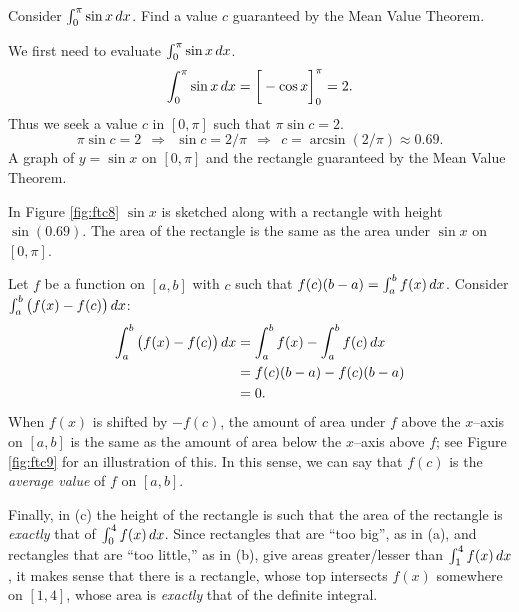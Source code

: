 \documentclass{ximera}
\begin{document}
\begin{example}%
  Consider $\int_0^\pi \sin x \,d x$. Find a value $c$ guaranteed by the Mean Value Theorem.
  \begin{explanation}
    We first need to evaluate $\int_0^\pi \sin x\,d x$.
    \[
    \int_0^\pi\sin x\,d x =\bigg[ -\cos x \bigg]_0^\pi = 2.
    \]
    Thus we seek a value $c$ in $[0,\pi]$ such that $\pi\sin c =2$. 
    \[
    \pi\sin c = 2\ \ \Rightarrow\ \ \sin c = 2/\pi\ \ \Rightarrow\ \ c = \arcsin(2/\pi) \approx 0.69.
    \]
    A graph of $y=\sin x$ on $[0,\pi]$ and the rectangle guaranteed by the Mean Value Theorem.
  \end{explanation}
\end{example}
In Figure \ref{fig:ftc8} $\sin x$ is sketched along with a rectangle
with height $\sin (0.69)$. The area of the rectangle is the same as
the area under $\sin x$ on $[0,\pi]$. 

Let $f$ be a function on $[a,b]$ with $c$ such that $f(c)(b-a) =
\int_a^bf(x)\,d x$. Consider $\int_a^b\big(f(x)-f(c)\big)\,d x$:
\begin{align*}
  \int_a^b\big(f(x)-f(c)\big)\,d x &= \int_a^b f(x) - \int_a^b f(c)\,d x\\
  &= f(c)(b-a) - f(c)(b-a) \\
  &= 0.
\end{align*}
When $f(x)$ is shifted by $-f(c)$, the amount of area under $f$ above
the $x$--axis on $[a,b]$ is the same as the amount of area below the
$x$--axis above $f$; see Figure \ref{fig:ftc9} for an illustration of
this. In this sense, we can say that $f(c)$ is the \textit{average
  value} of $f$ on $[a,b]$.


Finally, in (c) the height of the rectangle is such that the area of
the rectangle is \textit{exactly} that of $\int_0^4 f(x)\,d x$. Since
rectangles that are ``too big'', as in (a), and rectangles that are
``too little,'' as in (b), give areas greater/lesser than $\int_1^4
f(x)\,d x$, it makes sense that there is a rectangle, whose top
intersects $f(x)$ somewhere on $[1,4]$, whose area is \textit{exactly}
that of the definite integral.
\end{document}
